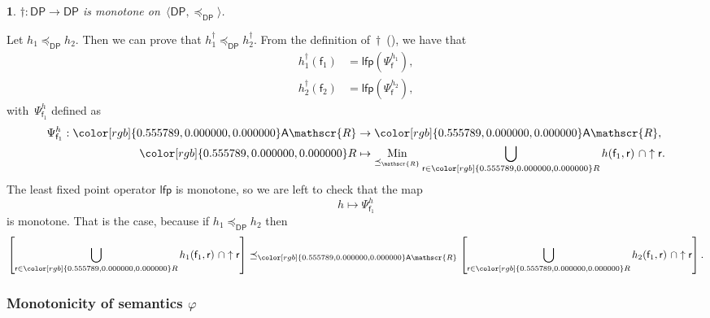 \documentclass[twocolumn,english]{IEEEconf}
\theoremstyle{plain}
\theoremstyle{definition}
\theoremstyle{definition}
\theoremstyle{plain}
\newtheorem{lem}[thm]{\protect\lemmaname}
\newcommand{\aword}[1]{\mathsf{#1}}
\newcommand{\vmath}[1]{\aword{#1}}
\DeclareMathOperator*{\Min}{Min}
\newcommand{\posleq}{\preceq}
\newcommand{\lfp}{\vmath{lfp}}
\newcommand{\antichains}{\vmath{A}}
\newcommand{\ftor}{{h}}
\newcommand{\fun}{\vmath{f}}
\newcommand{\res}{\vmath{r}}
\newcommand{\ressp}{\mathscr{R}}
\newcommand{\Aressp}{{\antichains\ressp}}
\newcommand{\dpsp}{\vmath{DP}}
\newcommand{\dpleq}{\posleq_\dpsp}
\newcommand{\dpsem}{\varphi}
\newcommand{\oploop}{\dagger}
\newcommand{\colR}{\color[rgb]{0.555789,0.000000,0.000000}}
\renewcommand{\Aressp}{{\colR\antichains\ressp}}
\providecommand{\lemmaname}{Lemma}
\begin{document}
\begin{lem}
\label{lem:loop-monotone}$\oploop:\dpsp\rightarrow\dpsp$ is monotone
on~$\langle\dpsp,\dpleq\rangle$.
\end{lem}
\begin{IEEEproof}
Let $\ftor_{1}\dpleq\ftor_{2}$. Then we can prove that $\ftor_{1}^{\oploop}\dpleq\ftor_{2}^{\oploop}$.
From the definition of~$\oploop$~(), we
have that 
\begin{align*}
\ftor_{1}^{\oploop}(\fun_{1}) & =\lfp(\Psi_{\fun}^{\ftor_{1}}),\\
\ftor_{2}^{\oploop}(\fun_{2}) & =\lfp(\Psi_{\fun}^{\ftor_{2}}),
\end{align*}
with~$\Psi_{\fun_{1}}^{\ftor}$ defined as 
\begin{align*}
\Psi_{\fun_{1}}^{\ftor}:\Aressp & \rightarrow\Aressp,\\
{\colR R} & \mapsto\Min_{\posleq_{\ressp}}\bigcup_{\res\in{\colR R}}\ftor(\fun_{1},\res)\ \cap\uparrow\res.
\end{align*}
The least fixed point operator $\lfp$ is monotone, so we are left
to check that the map 
\[
\ftor\mapsto\Psi_{\fun_{1}}^{\ftor}
\]
is monotone. That is the case, because if $\ftor_{1}\dpleq\ftor_{2}$
then 
\[
\left[\bigcup_{\res\in{\colR R}}\ftor_{1}(\fun_{1},\res)\ \cap\uparrow\res\right]\posleq_{\Aressp}\left[\bigcup_{\res\in{\colR R}}\ftor_{2}(\fun_{1},\res)\ \cap\uparrow\res\right].
\]
\end{IEEEproof}


\subsubsection{Monotonicity of semantics $\dpsem$}
\end{document}
